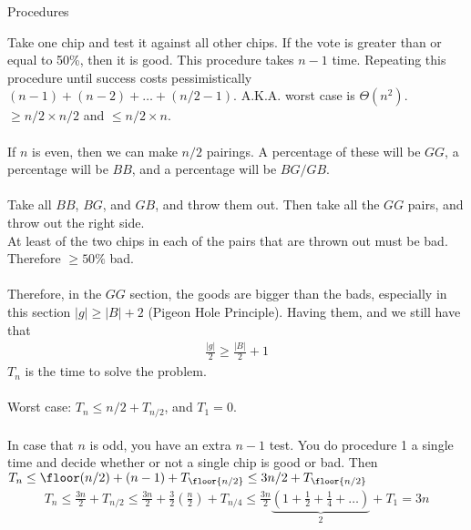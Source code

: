 \documentclass[class=scrartcl, crop=false]{standalone}
\begin{document}
\begin{example}
  Procedures
  \begin{enumerate}
    \ii
    Take one chip and test it against all other chips. If the vote is greater than or equal to 50\%, then it is good. This procedure takes $n - 1$ time. Repeating this procedure until success costs pessimistically $(n - 1) + (n - 2) + \dots + (n / 2 - 1)$. A.K.A. worst case is $\Theta(n^2)$. $\geq n / 2 \times n / 2$ and $\leq n / 2 \times n$. %
    \\\\
    \ii
    If $n$ is even, then we can make $n / 2$ pairings. A percentage of these will be $GG$, a percentage will be $BB$, and a percentage will be $BG / GB$.
    \\\\
    Take all $BB$, $BG$, and $GB$, and throw them out. Then take all the $GG$ pairs, and throw out the right side.
    \\
    At least of the two chips in each of the pairs that are thrown out must be bad. Therefore $\geq 50\%$ bad.
    \\\\
    Therefore, in the $GG$ section, the goods are bigger than the bads, especially in this section $|g| \geq |B| + 2$ (Pigeon Hole Principle). Having them, and we still have that 
    \begin{gather*}
      \frac{|g|}{2} \geq \frac{|B|}{2} + 1
    \end{gather*} 
    $T_n$ is the time to solve the problem.
    \\\\
    Worst case: $T_n \leq n / 2 + T_{n / 2}$, and  $T_1 = 0$.
    \\\\
    In case that $n$ is odd, you have an extra $n - 1$ test. You do procedure 1 a single time and decide whether or not a single chip is good or bad. Then $T_n \leq \floor(n / 2) + (n - 1) + T_{\floor{n / 2}} \leq 3n / 2 + T_{\floor{n / 2}}$
     \begin{gather*}
       T_n \leq \frac{3n}{2} + T_{n / 2} \leq \frac{3n}{2} + \frac{3}{2}(\frac{n}{2}) + T_{n / 4} \leq \frac{3n}{2}\underbrace{(1 + \frac{1}{2} + \frac{1}{4} + \dots)}_{2} + T_1 = 3n
    \end{gather*} 
  \end{enumerate} 
\end{example} 
\end{document}
